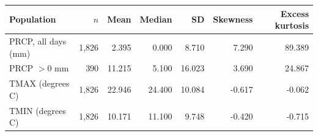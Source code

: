 \begin{tabularx}{\textwidth}{Yrrrrrr}
\toprule Population & $n$ & Mean & Median & SD & Skewness & Excess kurtosis\\\midrule
PRCP, all days (mm) & 1,826 & 2.395 & 0.000 & 8.710 & 7.290 & 89.389\\
PRCP $>0$ mm & 390 & 11.215 & 5.100 & 16.023 & 3.690 & 24.867\\
TMAX (degrees C) & 1,826 & 22.946 & 24.400 & 10.084 & -0.617 & -0.062\\
TMIN (degrees C) & 1,826 & 10.171 & 11.100 & 9.748 & -0.420 & -0.715\\
\bottomrule
\end{tabularx}
